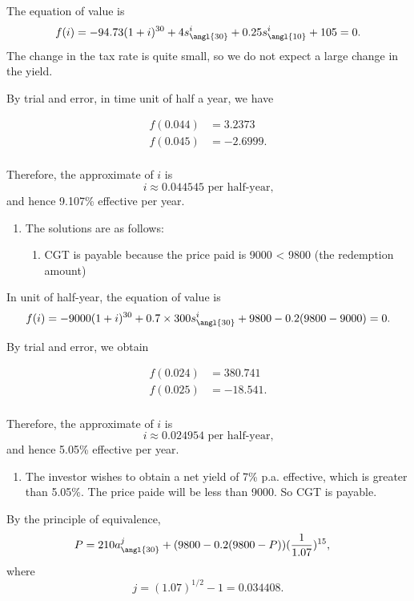 \documentclass[
]{article}
\providecommand{\tightlist}{%
  \setlength{\itemsep}{0pt}\setlength{\parskip}{0pt}}
\theoremstyle{definition}
\theoremstyle{definition}
\theoremstyle{definition}
\theoremstyle{definition}
\theoremstyle{remark}
\begin{document}
The equation of value is
\[ f(i) = -94.73 (1 + i)^{30} + 4 s^i_{\angl{30}} + 0.25 s^i_{\angl{10}} + 105 = 0.\]
The change in the tax rate is quite small, so we do not expect a large change in the yield.

By trial and error, in time unit of half a year, we have

\[
\begin{aligned}
f(0.044) &= 3.2373 \\
f(0.045) &= -2.6999. \\
\end{aligned}
\]

Therefore, the approximate of \(i\) is
\[ i \approx 0.044545 \text{ per half-year,} \]
and hence 9.107\% effective per year.

\begin{enumerate}
\def\labelenumi{\arabic{enumi}.}
\setcounter{enumi}{3}
\item
  The solutions are as follows:

  \begin{enumerate}
  \def\labelenumii{\arabic{enumii}.}
  \tightlist
  \item
    CGT is payable because the price paid is 9000 \textless{} 9800 (the redemption amount)
  \end{enumerate}
\end{enumerate}

In unit of half-year, the equation of value is
\[ f(i) = -9000 (1 + i)^{30} + 0.7 \times 300  s^i_{\angl{30}} + 9800 - 0.2(9800 - 9000) = 0.\]

By trial and error, we obtain

\[
\begin{aligned}
f(0.024) &= 380.741 \\
f(0.025) &= -18.541. \\
\end{aligned}
\]

Therefore, the approximate of \(i\) is
\[ i \approx 0.024954 \text{ per half-year,} \]
and hence 5.05\% effective per year.

\begin{enumerate}
\def\labelenumi{\arabic{enumi}.}
\setcounter{enumi}{1}
\tightlist
\item
  The investor wishes to obtain a net yield of 7\% p.a. effective, which is greater than 5.05\%. The price paide will be less than 9000. So CGT is payable.
\end{enumerate}

By the principle of equivalence,
\[
\begin{aligned}
P &= 210 a^j_{\angl{30}} + (9800 - 0.2(9800 - P)) (\frac{1}{1.07})^{15}, 
\end{aligned}
\]
where \[j = (1.07)^{1/2} - 1 = 0.034408.\]
\end{document}
